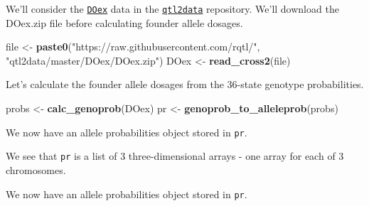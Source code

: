 \documentclass[oneside]{book}\usepackage[]{graphicx}\usepackage[]{color}
\newenvironment{Shaded}{\begin{snugshade}}{\end{snugshade}}
\newcommand{\CommentTok}[1]{\textcolor[rgb]{0.56,0.35,0.01}{\textit{#1}}}
\newcommand{\DataTypeTok}[1]{\textcolor[rgb]{0.13,0.29,0.53}{#1}}
\newcommand{\KeywordTok}[1]{\textcolor[rgb]{0.13,0.29,0.53}{\textbf{#1}}}
\newcommand{\NormalTok}[1]{#1}
\newcommand{\OperatorTok}[1]{\textcolor[rgb]{0.81,0.36,0.00}{\textbf{#1}}}
\newcommand{\StringTok}[1]{\textcolor[rgb]{0.31,0.60,0.02}{#1}}
\begin{document}
We'll consider the
\href{https://github.com/rqtl/qtl2data/tree/master/DOex}{\texttt{DOex}}
data in the \href{https://github.com/rqtl/qtl2data}{\texttt{qtl2data}}
repository. We'll download the DOex.zip file before calculating founder
allele dosages.

\begin{Shaded}
\begin{Highlighting}[]
\NormalTok{file <-}\StringTok{ }\KeywordTok{paste0}\NormalTok{(}\StringTok{"https://raw.githubusercontent.com/rqtl/"}\NormalTok{, }\StringTok{"qtl2data/master/DOex/DOex.zip"}\NormalTok{)}
\NormalTok{DOex <-}\StringTok{ }\KeywordTok{read_cross2}\NormalTok{(file)}
\end{Highlighting}
\end{Shaded}

Let's calculate the founder allele dosages from the 36-state genotype
probabilities.

\begin{Shaded}
\begin{Highlighting}[]
\NormalTok{probs <-}\StringTok{ }\KeywordTok{calc_genoprob}\NormalTok{(DOex)}
\NormalTok{pr <-}\StringTok{ }\KeywordTok{genoprob_to_alleleprob}\NormalTok{(probs)}
\end{Highlighting}
\end{Shaded}

We now have an allele probabilities object stored in \texttt{pr}.

\begin{Shaded}
\end{Shaded}

We see that \texttt{pr} is a list of 3 three-dimensional arrays - one
array for each of 3 chromosomes.

We now have an allele probabilities object stored in \texttt{pr}.

\begin{Shaded}
\end{Shaded}
\end{document}
